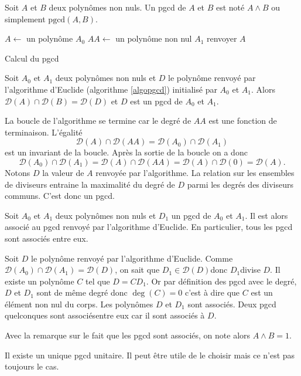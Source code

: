\begin{nota}
 Soit $A$ et $B$ deux polynômes non nuls. Un pgcd de $A$ et $B$ est noté $A\wedge B$ ou simplement $\text{pgcd}(A,B)$.
\end{nota}

\begin{algorithm}
 $A\leftarrow$ un polynôme $A_0$\;
 $AA\leftarrow$ un polynôme non nul $A_1$\;
 renvoyer $A$\;
 \caption{Calcul du pgcd}
 \label{algopgcd}
\end{algorithm}

\begin{prop}
Soit $A_0$ et $A_1$ deux polynômes non nuls et $D$ le polynôme renvoyé par l'algorithme d'Euclide (algorithme \ref{algopgcd}) initialisé par $A_0$ et $A_1$. Alors  $\mathcal{D}(A)\cap \mathcal{D}(B) = \mathcal{D}(D)$ et $D$ est un pgcd de $A_0$ et $A_1$.
\end{prop}
\begin{demo}
 La boucle de l'algorithme se termine car le degré de $AA$ est une fonction de terminaison. L'égalité
\[
 \mathcal{D}(A) \cap \mathcal{D}(AA) =  \mathcal{D}(A_0) \cap \mathcal{D}(A_1)
\]
est un invariant de la boucle. Après la sortie de la boucle on a donc
\[
 \mathcal{D}(A_0) \cap \mathcal{D}(A_1) = \mathcal{D}(A) \cap \mathcal{D}(AA) = \mathcal{D}(A) \cap \mathcal{D}(0) = \mathcal{D}(A).
\]
Notons $D$ la valeur de $A$ renvoyée par l'algorithme. La relation sur les ensembles de diviseurs entraine la maximalité du degré de $D$ parmi les degrés des diviseurs communs. C'est donc un pgcd.
\end{demo}
\begin{prop}
 Soit $A_0$ et $A_1$ deux polynômes non nuls et $D_1$ un pgcd de $A_0$ et $A_1$. Il est alors associé au pgcd renvoyé par l'algorithme d'Euclide. En particulier, tous les pgcd sont associés entre eux.
\end{prop}
\begin{demo}
 Soit $D$ le polynôme renvoyé par l'algorithme d'Euclide. Comme $\mathcal{D}(A_0)\cap\mathcal{D}(A_1)=\mathcal{D}(D)$, on sait que $D_1\in \mathcal{D}(D)$donc $D_1$divise $D$. Il existe un polynôme $C$ tel que $D = CD_1$. Or par définition des pgcd avec le degré, $D$ et $D_1$ sont de même degré donc $\deg(C)=0$ c'est à dire que $C$ est un élément non nul du corps. Les polynômes $D$ et $D_1$ sont associés. Deux pgcd quelconques sont associésentre eux car il sont associés à $D$.
\end{demo}
Avec la remarque sur le fait que les pgcd sont associés, on note alors $A\wedge B = 1$.
\begin{rem}
 Il existe un unique pgcd unitaire. Il peut être utile de le choisir mais ce n'est pas toujours le cas.
\end{rem}

